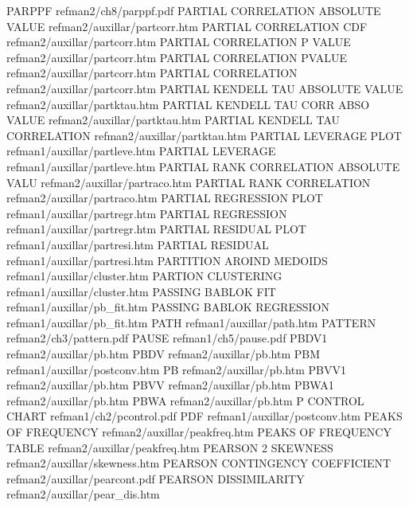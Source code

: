 PARPPF                                  refman2/ch8/parppf.pdf
PARTIAL CORRELATION ABSOLUTE VALUE      refman2/auxillar/partcorr.htm
PARTIAL CORRELATION CDF                 refman2/auxillar/partcorr.htm
PARTIAL CORRELATION P VALUE             refman2/auxillar/partcorr.htm
PARTIAL CORRELATION PVALUE              refman2/auxillar/partcorr.htm
PARTIAL CORRELATION                     refman2/auxillar/partcorr.htm
PARTIAL KENDELL TAU ABSOLUTE VALUE      refman2/auxillar/partktau.htm
PARTIAL KENDELL TAU CORR ABSO VALUE     refman2/auxillar/partktau.htm
PARTIAL KENDELL TAU CORRELATION         refman2/auxillar/partktau.htm
PARTIAL LEVERAGE PLOT                   refman1/auxillar/partleve.htm
PARTIAL LEVERAGE                        refman1/auxillar/partleve.htm
PARTIAL RANK CORRELATION ABSOLUTE VALU  refman2/auxillar/partraco.htm
PARTIAL RANK CORRELATION                refman2/auxillar/partraco.htm
PARTIAL REGRESSION PLOT                 refman1/auxillar/partregr.htm
PARTIAL REGRESSION                      refman1/auxillar/partregr.htm
PARTIAL RESIDUAL PLOT                   refman1/auxillar/partresi.htm
PARTIAL RESIDUAL                        refman1/auxillar/partresi.htm
PARTITION AROIND MEDOIDS                refman1/auxillar/cluster.htm
PARTION CLUSTERING                      refman1/auxillar/cluster.htm
PASSING BABLOK FIT                      refman1/auxillar/pb_fit.htm
PASSING BABLOK REGRESSION               refman1/auxillar/pb_fit.htm
PATH                                    refman1/auxillar/path.htm
PATTERN                                 refman2/ch3/pattern.pdf
PAUSE                                   refman1/ch5/pause.pdf
PBDV1                                   refman2/auxillar/pb.htm
PBDV                                    refman2/auxillar/pb.htm
PBM                                     refman1/auxillar/postconv.htm
PB                                      refman2/auxillar/pb.htm
PBVV1                                   refman2/auxillar/pb.htm
PBVV                                    refman2/auxillar/pb.htm
PBWA1                                   refman2/auxillar/pb.htm
PBWA                                    refman2/auxillar/pb.htm
P CONTROL CHART                         refman1/ch2/pcontrol.pdf
PDF                                     refman1/auxillar/postconv.htm
PEAKS OF FREQUENCY                      refman2/auxillar/peakfreq.htm
PEAKS OF FREQUENCY TABLE                refman2/auxillar/peakfreq.htm
PEARSON 2 SKEWNESS                      refman2/auxillar/skewness.htm
PEARSON CONTINGENCY COEFFICIENT         refman2/auxillar/pearcont.pdf
PEARSON DISSIMILARITY                   refman2/auxillar/pear_dis.htm
